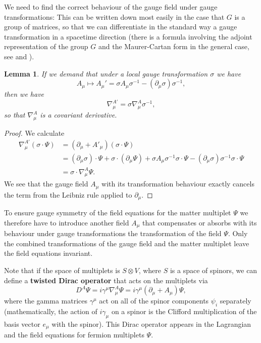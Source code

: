 \documentclass[12pt]{amsart}
\newtheorem{lem}[thm]{Lemma}
\theoremstyle{definition}
\theoremstyle{remark}
\numberwithin{equation}{section}
\begin{document}
We need to find the correct behaviour of the gauge field under gauge transformations: This can be written down most easily in the case that $G$ is a group of matrices, so that we can differentiate in the standard way a gauge transformation in a spacetime direction (there is a formula involving the adjoint representation of the group $G$ and the Maurer-Cartan form in the general case, see \cite[p.~79]{Baum} and \cite[p.~303]{Naber}). 
\begin{lem}\label{lem gauge transform gauge field}
If we demand that under a local gauge transformation $\sigma$ we have 
\begin{equation*}
A_\mu\longmapsto A_\mu'=\sigma A_\mu \sigma^{-1}-(\partial_\mu\sigma)\sigma^{-1},
\end{equation*}
then we have 
\begin{equation*}
\nabla_\mu^{A'}=\sigma\nabla_\mu^A \sigma^{-1},
\end{equation*}
so that $\nabla_\mu^A$ is a covariant derivative. 
\end{lem}
\begin{proof}
We calculate
\begin{align*}
\nabla_\mu^{A'}(\sigma\cdot\Psi)&=(\partial_\mu+A'_\mu)(\sigma\cdot\Psi)\\
&=(\partial_\mu\sigma)\cdot\Psi+\sigma\cdot(\partial_\mu\Psi)+\sigma A_\mu\sigma^{-1}\sigma\cdot\Psi-(\partial_\mu\sigma)\sigma^{-1}\sigma\cdot\Psi\\
&=\sigma\cdot\nabla^A_\mu\Psi.
\end{align*}
We see that the gauge field $A_\mu$ with its transformation behaviour exactly cancels the term from the Leibniz rule applied to $\partial_\mu$.
\end{proof}
To ensure gauge symmetry of the field equations for the matter multiplet $\Psi$ we therefore have to introduce another field $A_\mu$ that compensates or absorbs with its behaviour under gauge transformations the transformation of the field $\Psi$. Only the combined transformations of the gauge field and the matter multiplet leave the field equations invariant.

Note that if the space of multiplets is $S\otimes V$, where $S$ is a space of spinors, we can define a {\bf twisted Dirac operator} that acts on the multiplets via 
\begin{equation*}
D^A\Psi=i\gamma^\mu\nabla^A_\mu\Psi=i\gamma^\mu(\partial_\mu+A_\mu)\Psi,
\end{equation*}
where the gamma matrices $\gamma^\mu$ act on all of the spinor components $\psi_i$ separately (mathematically, the action of $i\gamma_\mu$ on a spinor is the Clifford multiplication of the basis vector $e_\mu$ with the spinor). This Dirac operator appears in the Lagrangian and the field equations for fermion multiplets $\Psi$.
\end{document}
